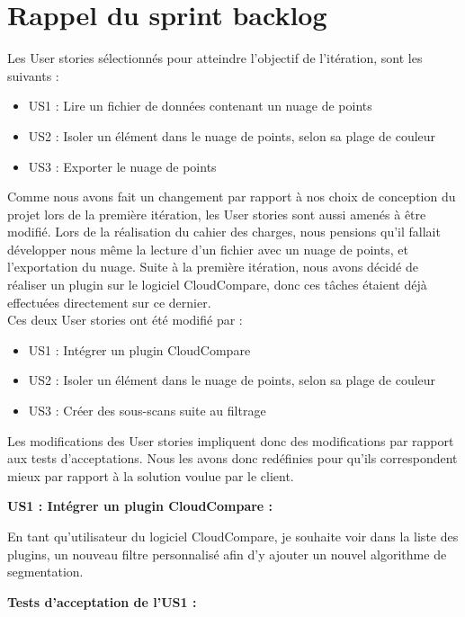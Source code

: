 \documentclass[12pt,titlepage,french]{article}
\begin{document}
\section{Rappel du sprint backlog}

Les User stories sélectionnés pour atteindre l'objectif de l'itération, sont les suivants :

\begin{itemize}
  \item US1 : Lire un fichier de données contenant un nuage de points
  \item US2 : Isoler un élément dans le nuage de points, selon sa plage de couleur
  \item US3 : Exporter le nuage de points
\end{itemize}

Comme nous avons fait un changement par rapport à nos choix de conception du projet lors de la première itération, les User stories sont aussi amenés à être modifié. Lors de la réalisation du cahier des charges, nous pensions qu'il fallait développer nous même la lecture d'un fichier avec un nuage de points, et l'exportation du nuage. Suite à la première itération, nous avons décidé de réaliser un plugin sur le logiciel CloudCompare, donc ces tâches étaient déjà effectuées directement sur ce dernier. \\
Ces deux User stories ont été modifié par : 
\begin{itemize}
  \item US1 : Intégrer un plugin CloudCompare
  \item US2 : Isoler un élément dans le nuage de points, selon sa plage de couleur
  \item US3 : Créer des sous-scans suite au filtrage\\
\end{itemize}

Les modifications des User stories impliquent donc des modifications par rapport aux tests d'acceptations. Nous les avons donc redéfinies pour qu'ils correspondent mieux par rapport à la solution voulue par le client.

\textbf{\og US1 : Intégrer un plugin CloudCompare :\fg{}}

En tant qu'utilisateur du logiciel CloudCompare, je souhaite voir dans la liste des plugins, un nouveau filtre personnalisé afin d'y ajouter un nouvel algorithme de segmentation.

\textbf{Tests d'acceptation de l'US1 :}
\end{document}
